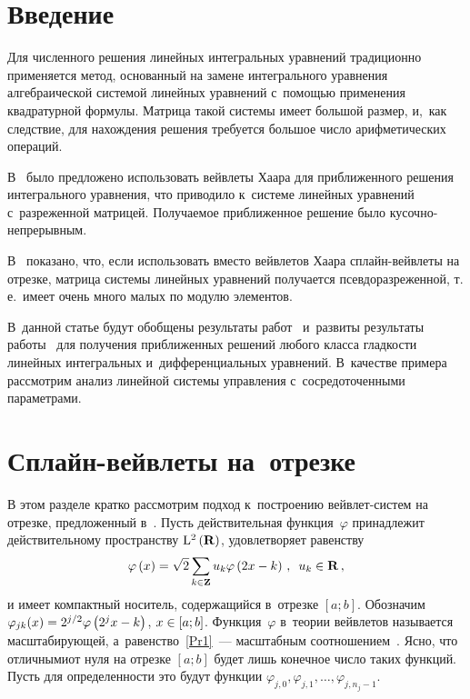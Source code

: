 
\thispagestyle{headings}

\begin{multicols}{2}

\label{st\stat}

\section{Введение} 

Для численного решения линейных интегральных уравнений традиционно 
применяется метод, основанный на замене интегрального уравнения 
алгебраической системой линейных уравнений с~помощью применения 
квадратурной формулы. Мат\-ри\-ца такой системы имеет большой размер, и,~как следствие, 
для нахождения решения требуется большое число арифметических операций. 

В~\cite{Lepik3} было предложено использовать вейвлеты Хаара 
для приближенного решения интегрального уравнения, что приводило 
к~системе линейных уравнений с~разреженной матрицей. Получаемое приближенное 
решение было ку\-соч\-но-не\-пре\-рыв\-ным. 

В~\cite{Blatov}  показано, что, если использовать вместо вейвлетов Хаара 
сплайн-вейв\-ле\-ты на отрезке, матрица системы линейных уравнений получается 
псевдоразреженной, т.\,е.\ имеет очень много малых по модулю элементов. 

В~данной статье будут обобщены результаты 
работ~\cite{Lepik1, Lepik2, Lepik3, Lepik4, Lepik} и~развиты результаты 
работы~\cite{Blatov} для получения приближенных решений любого класса гладкости 
линейных интегральных и~дифференциальных уравнений. 
В~качестве примера рассмотрим анализ линейной системы управления  с~сосредоточенными 
параметрами.

\section{Сплайн-вейвлеты на~отрезке}

В этом разделе  кратко рассмотрим подход к~построению вейв\-лет-сис\-тем 
на отрезке, предложенный в~\cite{ArticleFinkelstein}. Пусть действительная 
функция~$\varphi $ принадлежит действительному пространству 
$\mathrm{L}^{2} \left({\bf R}\right)$, удовлетво\-ряет равенству
\begin{equation} 
\label{Pr1}
\varphi \left(x\right)\hm=\sqrt{2} \sum\limits_{k\in {\bf Z}}u_{k} 
\varphi \left(2x-k\right)\,,\enskip u_{k} \in \mathbf{R}\,,
\end{equation}
и имеет компактный носитель, содержащийся в~отрезке $[a;b]$. 
Обозначим $\varphi _{jk} (x)\hm=2^{{j}/{2}}\varphi \left(2^{j} x-k\right)$,
$x\hm\in [a;b]$. Функция~$\varphi $ в~теории вейвлетов называ\-ется масштабирующей,
 а~равенство~\eqref{Pr1}~--- масштаб\-ным соотношением~\cite{Frazer}. 
 Ясно, что отличными\linebreak от нуля на отрезке $[a;b]$ будет лишь конечное чис\-ло
  таких функций. Пусть для определенности это будут функции $\varphi _{j,0},
\varphi _{j,1} ,\ldots,\varphi _{j,n_{j} -1}$. 


\end{multicols}
